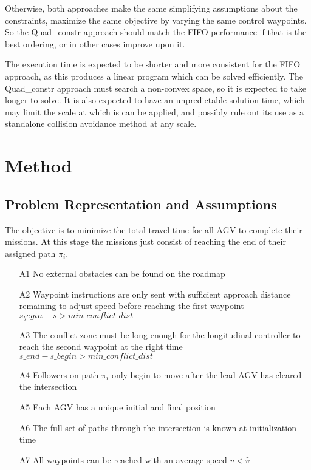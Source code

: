 \documentclass[11pt]{article} %
\begin{document}
Otherwise, both approaches make the same simplifying assumptions about the constraints, maximize the same objective by varying the same control waypoints. So the Quad\_constr approach should match the FIFO performance if that is the best ordering, or in other cases improve upon it.

The execution time is expected to be shorter and more consistent for the FIFO approach, as this produces a linear program which can be solved efficiently. The Quad\_constr approach must search a non-convex space, so it is expected to take longer to solve. It is also expected to have an unpredictable solution time, which may limit the scale at which is can be applied, and possibly rule out its use as a  standalone collision avoidance method at any scale.

\section{Method}
\subsection{Problem Representation and Assumptions}
The objective is to minimize the total travel time for all AGV to complete their missions. At this stage the missions just consist of reaching the end of their assigned path $\pi_i$. 

\begin{itemize}
\item[A1] No external obstacles can be found on the roadmap
\item[A2] Waypoint instructions are only sent with sufficient approach distance remaining to adjust speed  before reaching the first waypoint  $s_begin-s > min\_conflict\_dist$ 
\item[A3] The conflict zone must be long enough for the longitudinal controller to reach the second waypoint at the right time $s\_end - s\_begin > min\_conflict\_dist$ 
\item[A4] Followers on path $\pi_i$ only begin to move after the lead AGV has cleared the intersection 
\item[A5] Each AGV has a unique initial and final position
\item[A6] The full set of paths through the intersection is known at initialization time
\item[A7] All waypoints can be reached with an average speed $v < \hat{v}$
\end{itemize}
\end{document}

